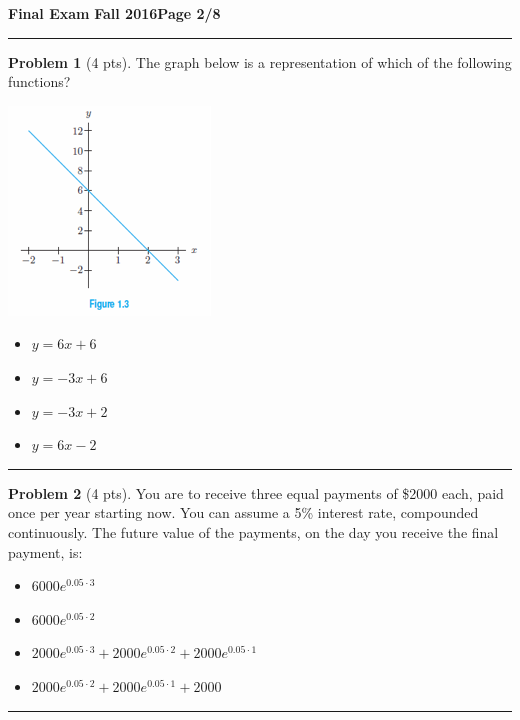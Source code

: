 \documentclass[12pt]{article}
\makeatletter
\theoremstyle{definition}
\newtheorem{problem}{Problem}
\newcommand*{\radiobutton}{%
  \@ifstar{\@radiobutton0}{\@radiobutton1}%
}
\newcommand*{\@radiobutton}[1]{%
  \begin{tikzpicture}
    \pgfmathsetlengthmacro\radius{height("X")/2}
    \draw[radius=\radius] circle;
    \ifcase#1 \fill[radius=.6*\radius] circle;\fi
  \end{tikzpicture}%
}
\makeatother
\begin{document}
\hfill{\large\bf Final Exam}\hfill{\large\bf
  Fall 2016}\hfill{\large\bf Page 2/8}\hrule

\bigskip

\begin{problem}[4 pts]
The graph below is a representation of which of the following functions?
\begin{multicols}{2}
\begin{center}
\includegraphics{1graph2.png}
\end{center}
\begin{itemize}
\item[\radiobutton] $y=6x+6$
\item[\radiobutton] $y=-3x+6$
\item[\radiobutton] $y=-3x+2$
\item[\radiobutton] $y=6x-2$
\end{itemize}
\end{multicols}
\end{problem}

\hrule
\begin{problem}[4 pts]
You are to receive three equal payments of \$2000 each, paid once per year starting now. You can assume a 5\% interest rate, compounded continuously. The future value of the payments, on the day you receive the final payment, is:
\begin{itemize}
\item[\radiobutton] $6000 e^{0.05 \cdot 3}$
\item[\radiobutton] $6000 e^{0.05 \cdot 2}$
\item[\radiobutton] $2000 e^{0.05 \cdot 3} + 2000 e^{0.05 \cdot 2} + 2000 e^{0.05 \cdot 1}$
\item[\radiobutton] $2000 e^{0.05 \cdot 2} + 2000 e^{0.05 \cdot 1} + 2000$
\end{itemize}
\end{problem}
\hrule
\end{document}
